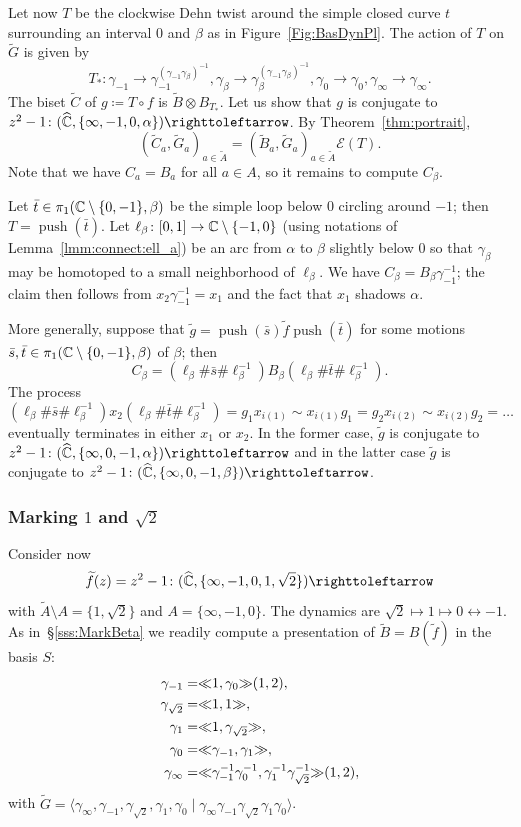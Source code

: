 \documentclass{amsart}
\newcommand\Antipush{{\mathcal E}}
\newcommand\Push{{\operatorname{push}}}
\newcommand\wtf{{\widetilde f}}
\newcommand\wtg{{\widetilde g}}
\newcommand\wtA{{\widetilde A}}
\newcommand\wtB{{\widetilde B}}
\newcommand\wtC{{\widetilde C}}
\newcommand\wtG{{\widetilde G}}
\begin{document}
Let now $T$ be the clockwise Dehn twist around the simple closed curve
$t$ surrounding an interval $0$ and $\beta$ as in
Figure~\ref{Fig:BasDynPl}. The action of $T$ on $\wtG$ is
given by
\[T_*\colon\gamma_{-1}\to
  \gamma_{-1}^{(\gamma_{-1}\gamma_\beta)^{-1}},\gamma_\beta\to
  \gamma_\beta^{(\gamma_{-1}\gamma_\beta)^{-1}},\gamma_0\to
  \gamma_0,\gamma_\infty\to\gamma_\infty.
\]
The biset $\wtC$ of $g\coloneqq T \circ f $ is
$\wtB\otimes B_{T_*}$.  Let us show that $g$ is conjugate to
${z^2-1\colon (\widehat\C,\{\infty,-1,0,\alpha\})\selfmap}$.  By
Theorem~\ref{thm:portrait},
\[(\wtC_a,\wtG_a)_{a\in \wtA}= (\wtB_a,\wtG_a)_{a\in \wtA} \Antipush(T).
\]
Note that we have $C_a=B_a$ for all $a\in A$, so it remains to compute
$C_\beta$.

Let $\bar t\in \pi_1({\mathbb C}\setminus\{0,-1\},\beta)$ be the simple loop
below $0$ circling around $-1$; then $T=\Push(\bar t)$. Let
$\ell_\beta\colon [0,1]\to{\mathbb C}\setminus\{-1,0\}$ (using notations of
Lemma~\ref{lmm:connect:ell_a}) be an arc from $\alpha$ to $\beta$
slightly below $0$ so that $\gamma_\beta$ may be homotoped to a small
neighborhood of $\ell_\beta$. We have
$C_\beta=B_\beta\gamma_{-1}^{-1}$; the claim then follows from
$x_2\gamma_{-1}^{-1}=x_1$ and the fact that $x_1$ shadows $\alpha$.

More generally, suppose that
$\wtg= \Push (\bar s) \wtf\Push (\bar t)$ for some
motions $\bar s, \bar t\in \pi_1({\mathbb C}\setminus\{0,-1\},\beta)$ of
$\beta$; then
\[C_\beta=(\ell_\beta \#\bar s \#\ell_\beta^{-1})B_\beta(\ell_\beta \#
  \bar t \#\ell_\beta^{-1}).
\]
The process
\[(\ell_\beta \#\bar s \#\ell_\beta^{-1})x_2 (\ell_\beta \#\bar t \#\ell_\beta^{-1})=g_1x_{i(1)}\sim x_{i(1)}g_1= g_2 x_{i(2)}\sim x_{i(2)}g_2=\dots
\]
eventually terminates in either $x_1$ or $x_2$. In the former case,
$\wtg$ is conjugate to
$z^2-1\colon (\widehat\C, \{\infty,0,-1,\alpha\})\selfmap$ and in
the latter case $\wtg$ is conjugate to
$z^2-1\colon (\widehat\C, \{\infty,0,-1,\beta\})\selfmap$.

\subsubsection{Marking $1$ and $\sqrt2$}\label{sss:MarkSqrt2}
Consider now
\[\wtf(z)=z^2-1\colon(\widehat\C,\{\infty, -1,0,1,\sqrt2
  \})\selfmap
\]
with $\wtA\setminus A=\{1,\sqrt2\}$ and
$A=\{\infty,-1,0\}$. The dynamics are
$\sqrt2\mapsto1\mapsto0\leftrightarrow-1$. As in~\S\ref{sss:MarkBeta}
we readily compute a presentation of $\wtB=B(\wtf)$ in the
basis $S$:
\begin{align*}
  \gamma_{-1}=&{\ll}1,\gamma_0{\gg}(1,2),\\
  \gamma_{\sqrt2}=&{\ll}1,1{\gg},\\
  \gamma_1=&{\ll}1,\gamma_{\sqrt2}{\gg},\\
  \gamma_0=&{\ll}\gamma_{-1},\gamma_1{\gg},\\
  \gamma_\infty=&{\ll}\gamma_{-1}^{-1}\gamma^{-1}_0,\gamma_1^{-1}\gamma_{\sqrt2}^{-1}{\gg}(1,2),
\end{align*}
with
$\wtG=\langle\gamma_\infty,\gamma_{-1},\gamma_{\sqrt2},\gamma_1,\gamma_0\mid
\gamma_\infty\gamma_{-1}\gamma_{\sqrt2}\gamma_1\gamma_0\rangle$.
\end{document}
